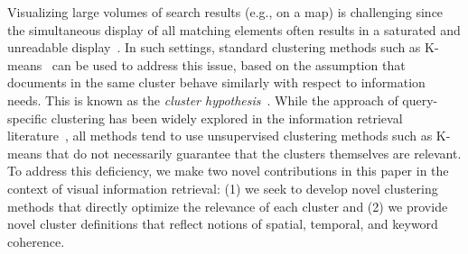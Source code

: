 
Visualizing large volumes of search results (e.g., on a map) is  challenging
since the simultaneous display of all matching elements often 
results in a saturated and unreadable display~\cite{Landesberger2011,Liu2014,Sun2013}. 
In such settings, standard clustering methods such as K-means~\cite{kmeans_original} can be used to address this issue, based on the assumption that documents in the same cluster behave similarly with respect to information needs. This is known as the \textit{cluster hypothesis}~\cite{Manning2008,Jardine1971,Voorhees1985,Rijsbergen1979}.
While the approach of query-specific clustering has been widely explored in the information retrieval  literature~\cite{Kurland2009,Kurland2011,Levi2018,Raiber2012,Altingovde2007,Liu2004}, all methods tend to use unsupervised clustering methods such as K-means that do not necessarily guarantee that the clusters themselves are relevant.  To address this deficiency, we make two novel contributions in this paper in the context of visual information retrieval: (1) we seek to develop novel clustering methods that directly optimize the relevance of each cluster and (2) we provide novel cluster definitions that reflect notions of spatial, temporal, and keyword coherence.



